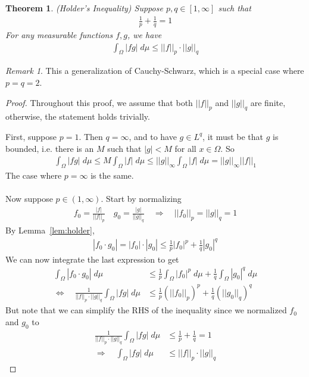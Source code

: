 \documentclass[12pt]{article}
\theoremstyle{plain}
\newtheorem{thm}{Theorem}[section]
\theoremstyle{definition}
\theoremstyle{remark}
\newtheorem*{rmk}{Remark}
\begin{document}
\begin{thm}
\label{thm:holder}
\emph{(Holder's Inequality)}%
Suppose $p,q\in[1,\infty]$ such that
\begin{align*}
  \frac{1}{p}
  +
  \frac{1}{q}
  =1
\end{align*}
For any measurable functions $f,g$, we have
\begin{align*}
  \int_\Omega |fg| \; d\mu \leq || f||_p \cdot || g||_{q}
\end{align*}
\end{thm}
\begin{rmk}
This a generalization of Cauchy-Schwarz, which is a special case where
$p=q=2$.
\end{rmk}
\begin{proof}
Throughout this proof, we assume that both $||f||_p$ and $||g||_q$ are
finite, otherwise, the statement holds trivially.

First, suppose $p=1$. Then $q=\infty$, and to have $g\in L^{q}$, it must
be that $g$ is bounded, i.e. there is an $M$ such that $|g|<M$ for all
$x\in\Omega$. So
\begin{align*}
    \int_\Omega |fg| \; d\mu \leq
    M\int_\Omega |f| \; d\mu \leq
    || g||_\infty\int_\Omega |f| \; d\mu
    =
    || g||_\infty|| f||_1
\end{align*}
The case where $p=\infty$ is the same.
\\
\\
Now suppose $p\in(1,\infty)$.
Start by normalizing
\begin{align*}
    f_0 = \frac{|f|}{|| f||_p}
    \quad
    g_0 = \frac{|g|}{|| g||_{q}}
    \quad \Rightarrow\quad
    || f_0||_p = || g||_{q}=1
\end{align*}
By Lemma~\ref{lem:holder},
\begin{align*}
  |f_0 \cdot g_0|=|f_0|\cdot|g_0|\leq
  \frac{1}{p} |f_0|^p
  +\frac{1}{q} |g_0|^{q}
\end{align*}
We can now integrate the last expression to get
\begin{align*}
    \int_\Omega
    |f_0\cdot g_0|\;d\mu&\leq
    \frac{1}{p}
    \int_\Omega |f_0|^p \;d\mu
    +\frac{1}{q}\int_\Omega |g_0|^{q}\;d\mu \\
    \Leftrightarrow\quad
    \frac{1}{|| f||_p \cdot || g||_{q}}
    \int_\Omega
    |f g|\;d\mu
    &\leq
    \frac{1}{p}\left(|| f_0||_p\right)^p
    +\frac{1}{q}\left(|| g_0||_{q}\right)^{q}
\end{align*}
But note that we can simplify the RHS of the inequality since we
normalized $f_0$ and $g_0$ to
\begin{align*}
    \frac{1}{|| f||_p \cdot || g||_{q}}
    \int_\Omega
    |f g|\;d\mu
    &\leq
    \frac{1}{p} + \frac{1}{q}=1\\
    \Rightarrow\quad
    \int_\Omega
    |f g|\;d\mu
    &\leq
    {|| f||_p \cdot || g||_{q}}
\end{align*}
\end{proof}
\end{document}
